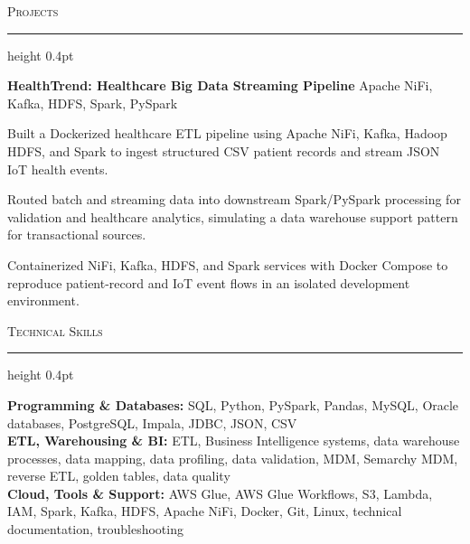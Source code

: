 \documentclass[letterpaper,11pt]{article}
\newcommand{\resumesection}[1]{%
  \par\vspace{2pt}%
  {\large\scshape #1}\par\vspace{2pt}%
  \hrule height 0.4pt\vspace{2pt}%
}
\newcommand{\projectHeading}[2]{
  \textbf{#1} \hfill #2
}
\begin{document}
\resumesection{Projects}
\projectHeading{HealthTrend: Healthcare Big Data Streaming Pipeline}{Apache NiFi, Kafka, HDFS, Spark, PySpark}
\begin{tightitemize}
  \item Built a Dockerized healthcare ETL pipeline using Apache NiFi, Kafka, Hadoop HDFS, and Spark to ingest structured CSV patient records and stream JSON IoT health events.
  \item Routed batch and streaming data into downstream Spark/PySpark processing for validation and healthcare analytics, simulating a data warehouse support pattern for transactional sources.
  \item Containerized NiFi, Kafka, HDFS, and Spark services with Docker Compose to reproduce patient-record and IoT event flows in an isolated development environment.
\end{tightitemize}

\resumesection{Technical Skills}
\textbf{Programming \& Databases:} SQL, Python, PySpark, Pandas, MySQL, Oracle databases, PostgreSQL, Impala, JDBC, JSON, CSV\\
\textbf{ETL, Warehousing \& BI:} ETL, Business Intelligence systems, data warehouse processes, data mapping, data profiling, data validation, MDM, Semarchy MDM, reverse ETL, golden tables, data quality\\
\textbf{Cloud, Tools \& Support:} AWS Glue, AWS Glue Workflows, S3, Lambda, IAM, Spark, Kafka, HDFS, Apache NiFi, Docker, Git, Linux, technical documentation, troubleshooting
\end{document}
